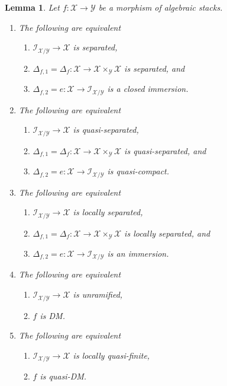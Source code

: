 \documentclass[10pt,a4paper]{amsart}
\theoremstyle{plain}
\newtheorem{lemma}[subsection]{Lemma}
\theoremstyle{definition}
\theoremstyle{remark}
\numberwithin{equation}{subsection}
\begin{document}
\begin{lemma}
\label{lemma-diagonal-diagonal}
Let $f : \mathcal{X} \to \mathcal{Y}$ be a morphism of algebraic stacks.
\begin{enumerate}
\item
The following are equivalent
\begin{enumerate}
\item $\mathcal{I}_{\mathcal{X}/\mathcal{Y}} \to \mathcal{X}$
is separated,
\item $\Delta_{f, 1} = \Delta_f :
\mathcal{X} \to \mathcal{X} \times_\mathcal{Y} \mathcal{X}$
is separated, and
\item $\Delta_{f, 2} = e :
\mathcal{X} \to \mathcal{I}_{\mathcal{X}/\mathcal{Y}}$
is a closed immersion.
\end{enumerate}
\item
The following are equivalent
\begin{enumerate}
\item $\mathcal{I}_{\mathcal{X}/\mathcal{Y}} \to \mathcal{X}$
is quasi-separated,
\item $\Delta_{f, 1} = \Delta_f :
\mathcal{X} \to \mathcal{X} \times_\mathcal{Y} \mathcal{X}$
is quasi-separated, and
\item $\Delta_{f, 2} = e :
\mathcal{X} \to \mathcal{I}_{\mathcal{X}/\mathcal{Y}}$
is quasi-compact.
\end{enumerate}
\item
The following are equivalent
\begin{enumerate}
\item $\mathcal{I}_{\mathcal{X}/\mathcal{Y}} \to \mathcal{X}$
is locally separated,
\item $\Delta_{f, 1} = \Delta_f :
\mathcal{X} \to \mathcal{X} \times_\mathcal{Y} \mathcal{X}$
is locally separated, and
\item $\Delta_{f, 2} = e :
\mathcal{X} \to \mathcal{I}_{\mathcal{X}/\mathcal{Y}}$
is an immersion.
\end{enumerate}
\item
The following are equivalent
\begin{enumerate}
\item $\mathcal{I}_{\mathcal{X}/\mathcal{Y}} \to \mathcal{X}$
is unramified,
\item $f$ is DM.
\end{enumerate}
\item
The following are equivalent
\begin{enumerate}
\item $\mathcal{I}_{\mathcal{X}/\mathcal{Y}} \to \mathcal{X}$
is locally quasi-finite,
\item $f$ is quasi-DM.
\end{enumerate}
\end{enumerate}
\end{lemma}
\end{document}
